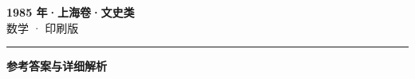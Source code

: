\documentclass[zihao=5, a4paper]{ctexart}
\begin{document}
\begin{center}
  {\Large\bfseries 1985 年·上海卷·文史类}\\[4pt]
  {\large 数学 · 印刷版}
\end{center}
\medskip
{}

\par\bigskip\hrule\bigskip
{}
\begin{center}{\large\bfseries 参考答案与详细解析}\end{center}
\smallskip

\end{document}
